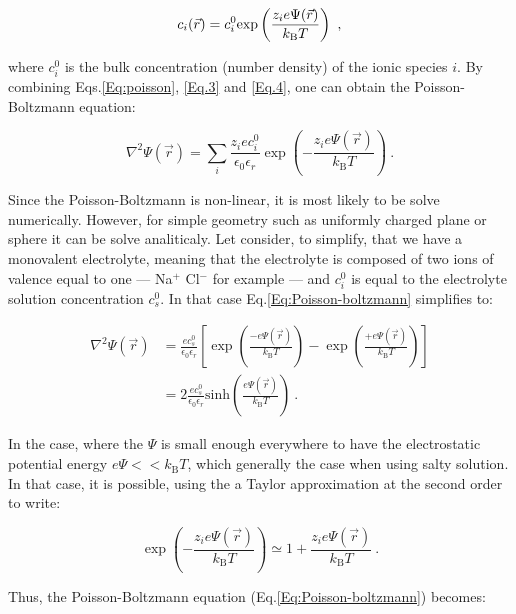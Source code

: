 \begin{equation}
	c_i(\vec{r}) = c_i ^0 \textnormal{exp}\left(\frac{z_i e \Psi(\vec{r})}{k_\mathrm{B} T }\right) ~,
	\label{Eq.4}
\end{equation}


where $c_i ^0$ is the bulk concentration (number density) of the ionic species $i$. By combining Eqs.\ref{Eq:poisson}, \ref{Eq.3} and \ref{Eq.4}, one can obtain the Poisson-Boltzmann equation:

\begin{equation}
	\nabla ^2 \Psi (\vec{r}) = \sum_i \frac{z_i e c_i^0}{\epsilon_0 \epsilon_r} \exp \left( - \frac{z_i e \Psi (\vec{r})}{k_\mathrm{B}T} \right) ~.
	\label{Eq:Poisson-boltzmann}
\end{equation}

Since the Poisson-Boltzmann is non-linear, it is most likely to be solve numerically. However, for simple geometry such as uniformly charged plane or sphere it can be solve analiticaly. Let consider, to simplify, that we have a monovalent electrolyte, meaning that the electrolyte is composed of two ions of valence equal to one --- Na$^+$ Cl$^-$ for example --- and $c_i ^0$ is equal to the electrolyte solution concentration $c_s^0$. In that case Eq.\ref{Eq:Poisson-boltzmann} simplifies to:

\begin{equation}
	\begin{aligned}
	\nabla ^2 \Psi (\vec{r}) &= \frac{e c_s ^0}{\epsilon_0 \epsilon_r} \left[ \exp \left( \frac{-e\Psi(\vec{r})}{k_\mathrm{B}T} \right) -  \exp \left( \frac{+e\Psi(\vec{r})}{k_\mathrm{B}T} \right) \right] \\
	& = 2 \frac{e c_s ^0}{\epsilon_0 \epsilon_r} \mathrm{sinh}  \left( \frac{e\Psi(\vec{r})}{k_\mathrm{B}T} \right) ~.
	\end{aligned}
\end{equation}

In the case, where the $\Psi$ is small enough everywhere to have the electrostatic potential energy $e\Psi << k_\mathrm{B} T$, which generally the case when using salty solution. In that case, it is possible, using the a Taylor approximation at the second order to write:

\begin{equation}
	\exp \left( - \frac{z_i e \Psi(\vec{r})}{k_\mathrm{B}T} \right) \simeq 1 + \frac{z_i e \Psi (\vec{r})}{k_\mathrm{B}T} ~.
\end{equation}

Thus, the Poisson-Boltzmann equation (Eq.\ref{Eq:Poisson-boltzmann}) becomes:

